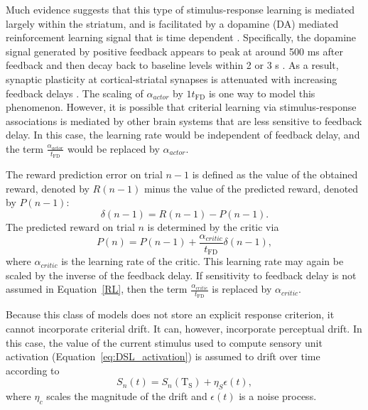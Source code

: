 \documentclass[doc, floatsintext]{apa7}
\begin{document}
Much evidence suggests that this type of stimulus-response
learning is mediated largely within the striatum, and is
facilitated by a dopamine (DA) mediated reinforcement
learning signal that is time dependent
\parencite[e.g.,][]{ValentinMaddoxAshby2014}. Specifically,
the dopamine signal generated by positive feedback appears
to peak at around 500 ms after feedback and then decay back
to baseline levels within 2 or 3 s
\parencite{YagishitaEtAl2014}. As a result, synaptic
plasticity at cortical-striatal synapses is attenuated with
increasing feedback delays \parencite{YagishitaEtAl2014}.
The scaling of $\alpha_{actor}$ by ${1}{t_\text{FD}}$ is one
way to model this phenomenon. However, it is possible that
criterial learning via stimulus-response associations is
mediated by other brain systems that are less sensitive to
feedback delay. In this case, the learning rate would be
independent of feedback delay, and the term
$\frac{\alpha_{actor}}{t_\text{FD}}$ would be replaced by
$\alpha_{actor}$.

The reward prediction error on trial $n-1$ is defined as the
value of the obtained reward, denoted by $R(n-1)$ minus the
value of the predicted reward, denoted by $P(n-1)$:
\begin{equation}
  \delta(n-1) = R(n-1) - P(n-1).
\end{equation}
The predicted reward on trial $n$ is determined by the
critic via
\begin{equation}
  P(n) = P(n-1) + \frac{\alpha_{critic}}{t_\text{FD}} \delta(n-1),
\end{equation}
where $\alpha_{critic}$ is the learning rate of the critic.
This learning rate may again be scaled by the inverse of the
feedback delay. If sensitivity to feedback delay is not
assumed in Equation~\ref{RL}, then the term
$\frac{\alpha_{critic}}{t_\text{FD}}$ is replaced by
$\alpha_{critic}$.

Because this class of models does not store an explicit
response criterion, it cannot incorporate criterial drift.
It can, however, incorporate perceptual drift. In this case,
the value of the current stimulus used to compute sensory
unit activation (Equation~\ref{eq:DSL_activation}) is
assumed to drift over time according to
\begin{equation}
  S_n(t) = S_n(\text{T}_\text{S}) + \eta_S \epsilon(t),
  \label{eq:stimulus_drift_RL}
\end{equation}
where $\eta_c$ scales the magnitude of the drift and
$\epsilon(t)$ is a noise process.
\end{document}
